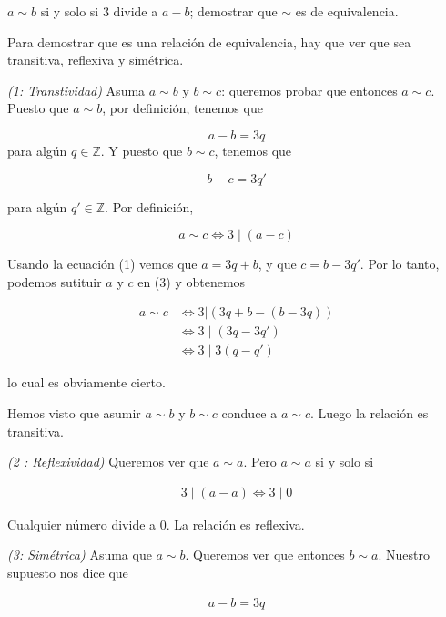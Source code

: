 \documentclass[a4paper, 12pt]{article}
\begin{document}
$a \sim b$ si y solo si $3$ divide a $a - b$; demostrar que $\sim$ es de equivalencia.

Para demostrar que es una relación de equivalencia, hay que ver que sea 
transitiva, reflexiva y simétrica. 

\textit{(1: Transtividad)} Asuma $a \sim b$ y $b \sim c$: queremos probar que
entonces $a \sim c$. Puesto que $a \sim b$, por definición, tenemos que 

\begin{equation}
a - b = 3q
\end{equation}
para algún $q \in \mathbb{Z}$. Y puesto que $b \sim c$, tenemos que 

\begin{equation}
    b - c = 3q'
\end{equation}

para algún $q' \in \mathbb{Z}$. Por definición,

\begin{equation}
    a \sim c \iff 3 \mid (a - c)
\end{equation}

Usando la ecuación (1) vemos que $a = 3q + b$, y que $c = b - 3q'$. Por lo tanto,
podemos sutituir $a$ y $c$ en (3) y obtenemos 

\begin{align*}
    a \sim c &\iff 3 | (3q + b - (b - 3q)) \\ 
             &\iff 3 \mid (3q - 3q') \\ 
             &\iff 3 \mid 3(q - q')
\end{align*}

lo cual es obviamente cierto. 

Hemos visto que asumir $a \sim b$ y $b \sim c$ conduce a $a \sim c$. Luego la relación es transitiva.

\textit{(2 : Reflexividad)} Queremos ver que $a \sim a$. Pero $a \sim a$ si y solo si 

\begin{align*}
    3 \mid (a - a) \iff 3 \mid 0
\end{align*}

Cualquier número divide a $0$. La relación es reflexiva. 

\textit{(3: Simétrica)} Asuma que $a \sim b$. Queremos ver que entonces $b \sim a$. Nuestro supuesto nos dice que 

\begin{align*}
    a - b = 3q
\end{align*}
\end{document}
